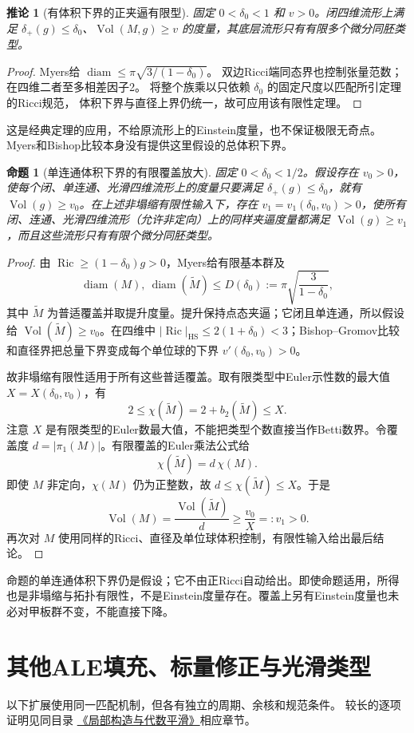 \documentclass[UTF8,a4paper,11pt,fontset=fandol]{ctexart}
\numberwithin{equation}{section}
\newtheorem{proposition}[theorem]{命题}
\newtheorem{corollary}[theorem]{推论}
\theoremstyle{definition}
\newcommand{\Ric}{\operatorname{Ric}}
\newcommand{\Vol}{\operatorname{Vol}}
\newcommand{\diam}{\operatorname{diam}}
\begin{document}
\begin{corollary}[有体积下界的正夹逼有限型]
固定 $0<\delta_0<1$ 和 $v>0$。闭四维流形上满足
$\delta_+(g)\le\delta_0$、$\Vol(M,g)\ge v$ 的度量，其底层流形只有有限多个微分同胚类型。
\end{corollary}
\begin{proof}
Myers给 $\diam\le\pi\sqrt{3/(1-\delta_0)}$。
双边Ricci端同态界也控制张量范数；在四维二者至多相差因子2。
将整个族乘以只依赖 $\delta_0$ 的固定尺度以匹配所引定理的Ricci规范，
体积下界与直径上界仍统一，故可应用该有限性定理。
\end{proof}
这是经典定理的应用，不给原流形上的Einstein度量，也不保证极限无奇点。
Myers和Bishop比较本身没有提供这里假设的总体积下界。

\begin{proposition}[单连通体积下界的有限覆盖放大]
固定 $0<\delta_0<1/2$。假设存在 $v_0>0$，使每个闭、单连通、光滑四维流形上的度量只要满足 $\delta_+(g)\le\delta_0$，就有 $\Vol(g)\ge v_0$。在上述非塌缩有限性输入下，存在 $v_1=v_1(\delta_0,v_0)>0$，使所有闭、连通、光滑四维流形（允许非定向）上的同样夹逼度量都满足 $\Vol(g)\ge v_1$，而且这些流形只有有限个微分同胚类型。
\end{proposition}
\begin{proof}
由 $\Ric\ge(1-\delta_0)g>0$，Myers给有限基本群及
\[
\diam(M),\ \diam(\widetilde M)\le
D(\delta_0):=\pi\sqrt{\frac3{1-\delta_0}},
\]
其中 $\widetilde M$ 为普适覆盖并取提升度量。提升保持点态夹逼；它闭且单连通，所以假设给 $\Vol(\widetilde M)\ge v_0$。在四维中
$|\Ric|_{\mathrm{HS}}\le2(1+\delta_0)<3$；Bishop--Gromov比较和直径界把总量下界变成每个单位球的下界 $v'(\delta_0,v_0)>0$。

故非塌缩有限性适用于所有这些普适覆盖。取有限类型中Euler示性数的最大值 $X=X(\delta_0,v_0)$，有
\[
2\le\chi(\widetilde M)=2+b_2(\widetilde M)\le X.
\]
注意 $X$ 是有限类型的Euler数最大值，不能把类型个数直接当作Betti数界。令覆盖度 $d=|\pi_1(M)|$。有限覆盖的Euler乘法公式给
\[
\chi(\widetilde M)=d\,\chi(M).
\]
即使 $M$ 非定向，$\chi(M)$ 仍为正整数，故 $d\le\chi(\widetilde M)\le X$。于是
\[
\Vol(M)=\frac{\Vol(\widetilde M)}d\ge\frac{v_0}{X}=:v_1>0.
\]
再次对 $M$ 使用同样的Ricci、直径及单位球体积控制，有限性输入给出最后结论。
\end{proof}
命题的单连通体积下界仍是假设；它不由正Ricci自动给出。即使命题适用，所得也是非塌缩与拓扑有限性，不是Einstein度量存在。覆盖上另有Einstein度量也未必对甲板群不变，不能直接下降。

\section{其他ALE填充、标量修正与光滑类型}
以下扩展使用同一匹配机制，但各有独立的周期、余核和规范条件。
较长的逐项证明见同目录
\href{20260912.tex}{《局部构造与代数平滑》}相应章节。
\end{document}
